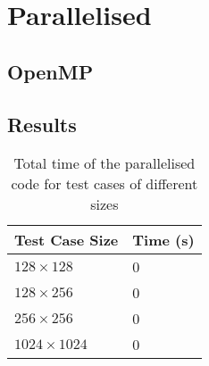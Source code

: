 \documentclass[11pt, twocolumn, a4paper]{article}
\begin{document}
\section{Parallelised}

\subsection{OpenMP}

\subsection{Results}

\begin{table}[htbp]
    \begin{center}
    \caption{Total time of the parallelised code for test cases of different sizes}\label{tab:parallelised}
    \begin{tabular}{l | l} 
        \hline\hline
        Test Case Size&Time (s)\\
        \hline
        $128 \times 128$&0\\
        $128 \times 256$&0\\
        $256 \times 256$&0\\
        $1024 \times 1024$&0\\
        \hline
      \end{tabular}
    \end{center}
\end{table} 

\clearpage

\onecolumn{
  \printbibliography
}
\end{document}
